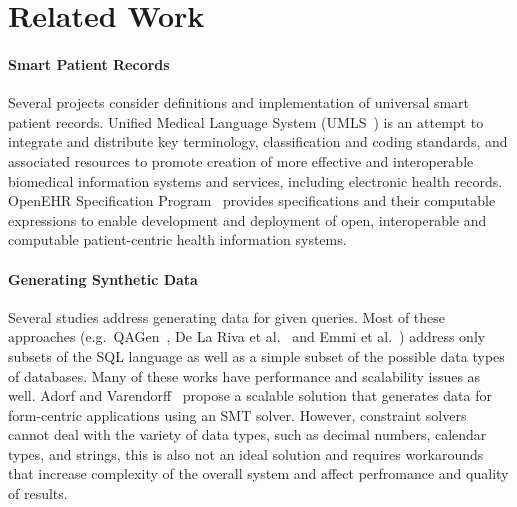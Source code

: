 \section{Related Work}
\label{sec:related}



\paragraph{Smart Patient Records}
Several projects consider definitions and implementation of universal smart patient records. Unified Medical Language System (UMLS~\cite{UMLS}) is an attempt to integrate and distribute key terminology, classification and coding standards, and associated resources to promote creation of more effective and interoperable biomedical information systems and services, including electronic health records. OpenEHR Specification Program~\cite{OpenEHR} provides specifications and their computable expressions to enable development and deployment of open, interoperable and computable patient-centric health information systems.

\paragraph{Generating Synthetic Data}
Several studies address generating data for given queries. Most of these approaches (e.g.~QAGen~\cite{qagen},  De La Riva et al.~\cite{riva} and Emmi et al.~\cite{emmi}) address only subsets of the SQL language as well as a simple subset of the possible data types of databases. Many of these works have performance and scalability issues as well. Adorf and Varendorff~\cite{adrof} propose a scalable solution that generates data for form-centric applications using an SMT solver. However, constraint solvers cannot deal with the variety of data types, such as decimal numbers, calendar types, and strings, this is also not an ideal solution and requires workarounds that increase complexity of the overall system and affect perfromance and quality of results. 

